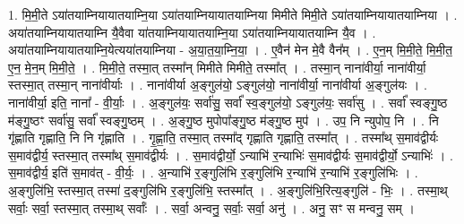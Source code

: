 \documentclass[17pt]{extarticle}
\begin{document}
1. मि॒मी॒ते ऽया॑तयाम्नियायातयाम्नि॒या ऽया॑तयाम्नियायातयाम्निया मिमीते मिमी॒ते ऽया॑तयाम्नियायातयाम्निया । . अया॑तयाम्नियायातयाम्नि यै॒वैवा या॑तयाम्नियायातयाम्नि॒या ऽया॑तयाम्नियायातयाम्नि यै॒व । . अया॑तयाम्नियायातयाम्नि॒येत्यया॑तयाम्निया - अ॒या॒त॒या॒म्नि॒या॒ । . ए॒वैन॑ मेन मे॒वै वैन᳚म् । . ए॒न॒म् मि॒मी॒ते॒ मि॒मी॒त॒ ए॒न॒ मे॒न॒म् मि॒मी॒ते॒ । . मि॒मी॒ते॒ तस्मा॒त् तस्मा᳚न् मिमीते मिमीते॒ तस्मा᳚त् । . तस्मा॒न् नाना॑वीर्या॒ नाना॑वीर्या॒ स्तस्मा॒त् तस्मा॒न् नाना॑वीर्याः । . नाना॑वीर्या अ॒ङ्गुल॑यो॒ ऽङ्गुल॑यो॒ नाना॑वीर्या॒ नाना॑वीर्या अ॒ङ्गुल॑यः । . नाना॑वीर्या॒ इति॒ नाना᳚ - वी॒र्याः॒ । . अ॒ङ्गुल॑यः॒ सर्वा॑सु॒ सर्वा᳚ स्व॒ङ्गुल॑यो॒ ऽङ्गुल॑यः॒ सर्वा॑सु । . सर्वा᳚ स्वङ्गु॒ष्ठ म॑ङ्गु॒ष्ठꣳ सर्वा॑सु॒ सर्वा᳚ स्वङ्गु॒ष्ठम् । . अ॒ङ्गु॒ष्ठ मुपोपा᳚ङ्गु॒ष्ठ म॑ङ्गु॒ष्ठ मुप॑ । . उप॒ नि न्युपोप॒ नि । . नि गृ॑ह्णाति गृह्णाति॒ नि नि गृ॑ह्णाति । . गृ॒ह्णा॒ति॒ तस्मा॒त् तस्मा᳚द् गृह्णाति गृह्णाति॒ तस्मा᳚त् । . तस्मा᳚थ् स॒माव॑द्वीर्यः स॒माव॑द्वीर्य॒ स्तस्मा॒त् तस्मा᳚थ् स॒माव॑द्वीर्यः । . स॒माव॑द्वीर्यो॒ ऽन्याभि॑ र॒न्याभिः॑ स॒माव॑द्वीर्यः स॒माव॑द्वीर्यो॒ ऽन्याभिः॑ । . स॒माव॑द्वीर्य॒ इति॑ स॒माव॑त् - वी॒र्यः॒ । . अ॒न्याभि॑ र॒ङ्गुलि॑भि र॒ङ्गुलि॑भि र॒न्याभि॑ र॒न्याभि॑ र॒ङ्गुलि॑भिः । . अ॒ङ्गुलि॑भि॒ स्तस्मा॒त् तस्मा॑ द॒ङ्गुलि॑भि र॒ङ्गुलि॑भि॒ स्तस्मा᳚त् । . अ॒ङ्गुलि॑भि॒रित्य॒ङ्गुलि॑ - भिः॒ । . तस्मा॒थ् सर्वाः॒ सर्वा॒ स्तस्मा॒त् तस्मा॒थ् सर्वाः᳚ । . सर्वा॒ अन्वनु॒ सर्वाः॒ सर्वा॒ अनु॑ । . अनु॒ सꣳ स मन्वनु॒ सम् । \newline
\end{document}
